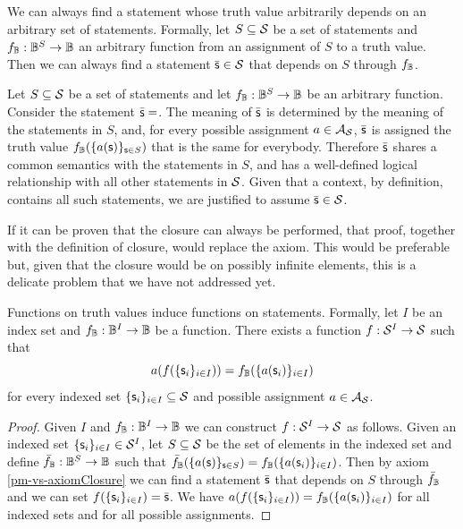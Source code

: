 \begin{mathSection}
	\begin{axiom}\label{pm-vs-axiomClosure}
		We can always find a statement whose truth value arbitrarily depends on an arbitrary set of statements. Formally, let $S \subseteq \mathcal{S}$ be a set of statements and $f_{\mathbb{B}} : \mathbb{B}^S \to \mathbb{B}$ an arbitrary function from an assignment of $S$ to a truth value. Then we can always find a statement $\bar{\mathsf{s}} \in \mathcal{S}$ that depends on $S$ through $f_{\mathbb{B}}$.
	\end{axiom}
	\begin{justification}
		Let $S \subseteq \mathcal{S}$ be a set of statements and let $f_{\mathbb{B}} : \mathbb{B}^S \to \mathbb{B}$ be an arbitrary function. Consider the statement $\bar{\mathsf{s}}=$. The meaning of $\bar{\mathsf{s}}$ is determined by the meaning of the statements in $S$, and, for every possible assignment $a \in \mathcal{A}_{\mathcal{S}}$, $\bar{\mathsf{s}}$ is assigned the truth value $f_{\mathbb{B}} (\{a(\mathsf{s})\}_{\mathsf{s} \in S})$ that is the same for everybody. Therefore $\bar{\mathsf{s}}$ shares a common semantics with the statements in $S$, and has a well-defined logical relationship with all other statements in $\mathcal{S}$. Given that a context, by definition, contains all such statements, we are justified to assume $\bar{\mathsf{s}} \in \mathcal{S}$.
	\end{justification}
	
	\begin{remark}
		If it can be proven that the closure can always be performed, that proof, together with the definition of closure, would replace the axiom. This would be preferable but, given that the closure would be on possibly infinite elements, this is a delicate problem that we have not addressed yet.
	\end{remark}
	
	\begin{coro}
		Functions on truth values induce functions on statements. Formally, let $I$ be an index set and $f_{\mathbb{B}} : \mathbb{B}^I \to \mathbb{B}$ be a function. There exists a function $f : \mathcal{S}^I \to \mathcal{S}$ such that
		$$a(f(\{\mathsf{s}_i\}_{i \in I})) = f_{\mathbb{B}}(\{a(\mathsf{s}_i)\}_{i \in I})$$
		for every indexed set $\{\mathsf{s}_i\}_{i \in I} \subseteq \mathcal{S}$ and possible assignment $a \in \mathcal{A}_{\mathcal{S}}$.
	\end{coro}
	\begin{proof}
		Given $I$ and $f_{\mathbb{B}} : \mathbb{B}^I \to \mathbb{B}$ we can construct $f : \mathcal{S}^I \to \mathcal{S}$ as follows. Given an indexed set $\{\mathsf{s}_i\}_{i \in I} \in \mathcal{S}^I$, let $S \subseteq \mathcal{S}$ be the set of elements in the indexed set and define $\bar{f}_{\mathbb{B}} : \mathbb{B}^S \to \mathbb{B}$ such that $\bar{f}_{\mathbb{B}}(\{a(\mathsf{s})\}_{\mathsf{s} \in S}) = f_{\mathbb{B}}(\{a(\mathsf{s}_i)\}_{i \in I})$. Then by axiom \ref{pm-vs-axiomClosure} we can find a statement $\bar{\mathsf{s}}$ that depends on $S$ through $\bar{f}_{\mathbb{B}}$ and we can set $f(\{\mathsf{s}_i\}_{i \in I}) = \bar{\mathsf{s}}$. We have $a(f(\{\mathsf{s}_i\}_{i \in I})) = f_{\mathbb{B}}(\{a(\mathsf{s}_i)\}_{i \in I})$ for all indexed sets and for all possible assignments.
	\end{proof}
\end{mathSection}

